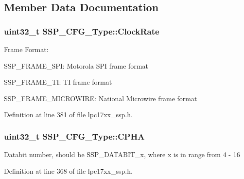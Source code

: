 \subsection{\-Member \-Data \-Documentation}
\hypertarget{struct_s_s_p___c_f_g___type_a00f744e032746b5b107556a9d7094c4a}{
\subsubsection[{\-Clock\-Rate}]{\setlength{\rightskip}{0pt plus 5cm}uint32\-\_\-t {\bf \-S\-S\-P\-\_\-\-C\-F\-G\-\_\-\-Type\-::\-Clock\-Rate}}}\label{struct_s_s_p___c_f_g___type_a00f744e032746b5b107556a9d7094c4a}
\-Frame \-Format\-:
\begin{DoxyItemize}
\item \-S\-S\-P\-\_\-\-F\-R\-A\-M\-E\-\_\-\-S\-P\-I\-: \-Motorola \-S\-P\-I frame format
\item \-S\-S\-P\-\_\-\-F\-R\-A\-M\-E\-\_\-\-T\-I\-: \-T\-I frame format
\item \-S\-S\-P\-\_\-\-F\-R\-A\-M\-E\-\_\-\-M\-I\-C\-R\-O\-W\-I\-R\-E\-: \-National \-Microwire frame format 
\end{DoxyItemize}

\-Definition at line 381 of file lpc17xx\-\_\-ssp.\-h.

\hypertarget{struct_s_s_p___c_f_g___type_af34662ac679b1c7329ed644a749dd2da}{
\subsubsection[{\-C\-P\-H\-A}]{\setlength{\rightskip}{0pt plus 5cm}uint32\-\_\-t {\bf \-S\-S\-P\-\_\-\-C\-F\-G\-\_\-\-Type\-::\-C\-P\-H\-A}}}\label{struct_s_s_p___c_f_g___type_af34662ac679b1c7329ed644a749dd2da}
\-Databit number, should be \-S\-S\-P\-\_\-\-D\-A\-T\-A\-B\-I\-T\-\_\-x, where x is in range from 4 -\/ 16 

\-Definition at line 368 of file lpc17xx\-\_\-ssp.\-h.

